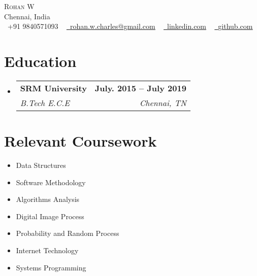 \documentclass[letterpaper,10pt]{article}
\makeatletter
\newcommand{\resumeSubheading}[4]{
  \vspace{-2pt}\item
    \begin{tabular*}{1.0\textwidth}[t]{l@{\extracolsep{\fill}}r}
      \textbf{#1} & \textbf{\small #2} \\
      \textit{\small#3} & \textit{\small #4} \\
    \end{tabular*}\vspace{-7pt}
}
\newcommand{\resumeSubHeadingListStart}{\begin{itemize}[leftmargin=0.0in, label={}]}
\newcommand{\resumeSubHeadingListEnd}{\end{itemize}}
\makeatother
\begin{document}

\begin{center}
    {\Huge \scshape Rohan W} \\ \vspace{1pt}
    Chennai, India \\ \vspace{1pt}
    \small \raisebox{-0.1\height}\faPhone\ +91 9840571093 ~ \href{mailto:rohan.w.charles@gmail.com}{\raisebox{-0.2\height}\faEnvelope\  \underline{rohan.w.charles@gmail.com}} ~ 
    \href{https://linkedin.com/in/rohan-winsor-a80547161/}{\raisebox{-0.2\height}\faLinkedin\ \underline{linkedin.com}}  ~
    \href{https://github.com/rohanwinsor}{\raisebox{-0.2\height}\faGithub\ \underline{github.com}}
    \vspace{-8pt}
\end{center}


\section{Education}
  \resumeSubHeadingListStart
    \resumeSubheading
      {SRM University}{July. 2015 -- July 2019}
      {B.Tech E.C.E}{Chennai, TN}
  \resumeSubHeadingListEnd

\section{Relevant Coursework}
        \begin{multicols}{4}
            \begin{itemize}[itemsep=-5pt, parsep=3pt]
                \item\small Data Structures
                \item Software Methodology
                \item Algorithms Analysis
                \item Digital Image Process
                \item Probability and Random Process
                \item Internet Technology
                \item Systems Programming
            \end{itemize}
        \end{multicols}
        \vspace*{2.0\multicolsep}
\end{document}
